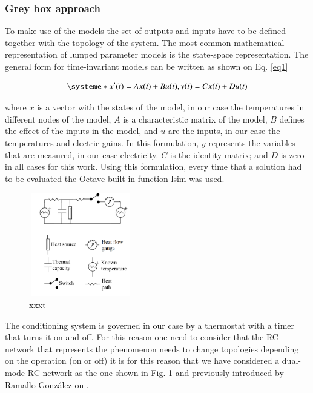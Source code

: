 \documentclass[3p,times,procedia]{elsarticle}
\begin{document}
\subsubsection{ Grey box approach}


To make use of the models the set of outputs and inputs have to be defined together with the topology of the system. 
The most common mathematical representation of lumped parameter models is the state-space representation. The general form for time-invariant models can be written as shown on Eq. \ref{eq1}

\begin{equation}\label{eq1}
\systeme*{x'(t)=Ax(t) + Bu(t), y(t)= Cx(t) + Du(t)}
\end{equation}

where $x$ is a vector with the states of the model, in our case the temperatures in different nodes of the model, $A$ is a characteristic matrix of the model, $B$ defines the effect of the inputs in the model, and $u$ are the inputs, in our case the temperatures and electric gains. In this formulation, $y$ represents the variables that are measured, in our case electricity. $C$ is the identity matrix; and $D$ is zero in all cases for this work. Using this formulation, every time that a solution had to be evaluated the Octave built in function lsim was used.

\begin{figure}[h]%
\centering
\centerline{\includegraphics[width=4.5cm,height=4.5cm,keepaspectratio]{./pics/figAlf.pdf}}
\caption{xxxt}\vspace*{-6pt}
  \label{fig:alf}
\end{figure}

The conditioning system is governed in our case by a thermostat with a timer that turns it on and off. For this reason one need to consider that the RC-network that represents the phenomenon needs to change topologies depending on the operation (on or off) it is for this reason that we have considered a dual-mode RC-network as the one shown in Fig. \ref{fig:alf} and previously introduced by Ramallo-González on \citep{ramalloidentifying}.
\end{document}
